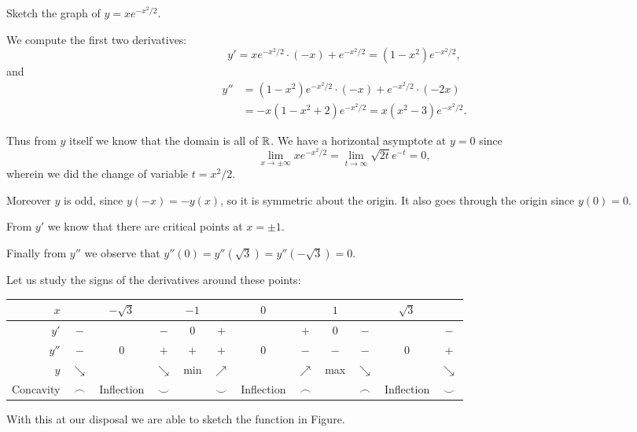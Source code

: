 \begin{example}
	Sketch the graph of $y = x e^{-x^2 / 2}$.

	We compute the first two derivatives:
	\[
		y' = x e^{-x^2 / 2} \cdot (-x) + e^{-x^2 / 2} = (1 - x^2) e^{-x^2 / 2},
	\]
	and
	\begin{align*}
		y'' & = (1 - x^2) e^{-x^2 / 2} \cdot (-x) + e^{-x^2 / 2} \cdot (-2x) \\
		    & = -x (1 - x^2 + 2) e^{-x^2 / 2} = x (x^2 - 3) e^{-x^2 / 2}.
	\end{align*}

	\noindent
	Thus from $y$ itself we know that the domain is all of $\mathbb{R}$.
	We have a horizontal asymptote at $y = 0$ since
	\[
		\lim_{x \to \pm \infty} x e^{- x^2 / 2} = \lim_{t \to \infty} \sqrt{2t} e^{-t} = 0,
	\]
	wherein we did the change of variable $t = x^2 / 2$.

	Moreover $y$ is odd, since $y(-x) = -y(x)$, so it is symmetric about the origin.
	It also goes through the origin since $y(0) = 0$.

	From $y'$ we know that there are critical points at $x = \pm 1$.

	Finally from $y''$ we observe that $y''(0) = y''(\sqrt{3}) = y''(-\sqrt{3}) = 0$.

	Let us study the signs of the derivatives around these points:

	\bigskip

	\begin{adjustbox}{center}
		\begin{tabular}{r | *{11}{c}}
			$x$       &            & $-\sqrt{3}$ &            & $-1$ &            & $0$        &            & $1$ &            & $\sqrt{3}$ &            \\ \hline
			$y'$      & $-$        &             & $-$        & $0$  & $+$        &            & $+$        & $0$ & $-$        &            & $-$        \\
			$y''$     & $-$        & $0$         & $+$        & $+$  & $+$        & $0$        & $-$        & $-$ & $-$        & $0$        & $+$        \\
			$y$       & $\searrow$ &             & $\searrow$ & min  & $\nearrow$ &            & $\nearrow$ & max & $\searrow$ &            & $\searrow$ \\
			Concavity & $\frown$   & Inflection  & $\smile$   &      & $\smile$   & Inflection & $\frown$   &     & $\frown$   & Inflection & $\smile$
		\end{tabular}
	\end{adjustbox}

	\noindent
	With this at our disposal we are able to sketch the function in Figure.
\end{example}

